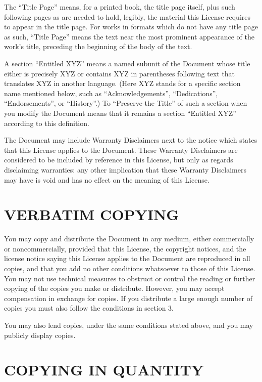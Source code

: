 The ``Title Page'' means, for a printed book, the title page itself,
plus such following pages as are needed to hold, legibly, the material
this License requires to appear in the title page. For works in formats
which do not have any title page as such, ``Title Page'' means the text
near the most prominent appearance of the work's title, preceding the
beginning of the body of the text.

A section ``Entitled XYZ'' means a named subunit of the Document whose
title either is precisely XYZ or contains XYZ in parentheses following
text that translates XYZ in another language. (Here XYZ stands for a
specific section name mentioned below, such as ``Acknowledgements'',
``Dedications'', ``Endorsements'', or ``History''.) To ``Preserve the
Title'' of such a section when you modify the Document means that it
remains a section ``Entitled XYZ'' according to this definition.

The Document may include Warranty Disclaimers next to the notice which
states that this License applies to the Document. These Warranty
Disclaimers are considered to be included by reference in this License,
but only as regards disclaiming warranties: any other implication that
these Warranty Disclaimers may have is void and has no effect on the
meaning of this License.

\section{VERBATIM COPYING}\label{verbatim-copying}

You may copy and distribute the Document in any medium, either
commercially or noncommercially, provided that this License, the
copyright notices, and the license notice saying this License applies to
the Document are reproduced in all copies, and that you add no other
conditions whatsoever to those of this License. You may not use
technical measures to obstruct or control the reading or further copying
of the copies you make or distribute. However, you may accept
compensation in exchange for copies. If you distribute a large enough
number of copies you must also follow the conditions in section 3.

You may also lend copies, under the same conditions stated above, and
you may publicly display copies.

\section{COPYING IN QUANTITY}\label{copying-in-quantity}

